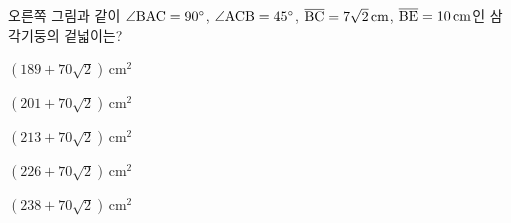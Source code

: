 \noindent\begin{minipage}[t]{0.58\linewidth}\vspace{0pt}\raggedright 오른쪽 그림과 같이 $\angle\mathrm{BAC}=90^\circ$, $\angle\mathrm{ACB}=45^\circ$, $\overline{\mathrm{BC}}=7\sqrt{2}\,\mathrm{cm}$, $\overline{\mathrm{BE}}=10\,\mathrm{cm}$인 삼각기둥의 겉넓이는?\end{minipage}\hfill\begin{minipage}[t]{0.4\linewidth}\vspace{0pt}\centering \resizebox{\ifdim\width>\linewidth\linewidth\else\width\fi}{!}{}\end{minipage}\par
\begin{choicesv}{\rule[-3ex]{0pt}{8ex}$(189+70\sqrt{2})\,\mathrm{cm}^2$}{\rule[-3ex]{0pt}{8ex}$(201+70\sqrt{2})\,\mathrm{cm}^2$}{\rule[-3ex]{0pt}{8ex}$(213+70\sqrt{2})\,\mathrm{cm}^2$}{\rule[-3ex]{0pt}{8ex}$(226+70\sqrt{2})\,\mathrm{cm}^2$}{\rule[-3ex]{0pt}{8ex}$(238+70\sqrt{2})\,\mathrm{cm}^2$}\end{choicesv}
